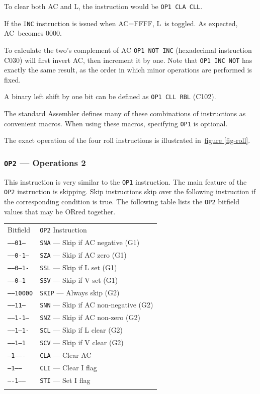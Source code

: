 \documentclass[11pt,a4paper,twocolumns]{article}
\newcommand\zebra{\rowcolors{2}{gray!20}{white}}
\newcommand{\npcf}[2][section]{\hyperref[#2]{#1 \ref*{#2}}}
\newcommand{\npfcf}[1]{\npcf[figure]{#1}}
\newcommand\hex[1]{\textsf{#1}}
\newcommand\register[1]{\textsf{#1}}
\newcommand\A{\register{AC}}
\newcommand\Lreg{\register{L}}
\newcommand\Ireg{\register{I}}
\newcommand\Vreg{\register{V}}
\begin{document}
To clear both \A{} and \Lreg, the instruction would be {\tt OP1 CLA CLL}.

If the {\tt INC} instruction is issued when \A=\hex{FFFF}, \Lreg\ is
toggled. As expected, \A\ becomes \hex{0000}.

To calculate the two's complement of \A{} {\tt OP1 NOT INC} (hexadecimal
instruction \hex{C030}) will first invert \A{}, then increment it by
one. Note that {\tt OP1 INC NOT} has exactly the same result, as the
order in which minor operations are performed is fixed.

A binary left shift by one bit can be defined as {\tt OP1 CLL RBL}
(\hex{C102}).

The standard Assembler defines many of these combinations of 
instructions as
convenient macros. When using these macros, specifying {\tt OP1} is
optional.

The exact operation of the four roll instructions is illustrated
in~\npfcf{fig-roll}.

\subsubsection{{\tt OP2} — Operations 2}
\label{sec-op2}

This instruction is very similar to the {\tt OP1} instruction. The
main feature of the {\tt OP2} instruction is skipping. Skip
instructions skip over the following instruction if the corresponding
condition is true. The following table lists the {\tt OP2} bitfield
values that may be ORred together.

\vspace{1em}\noindent\begin{center}
\zebra
\begin{tabular}{ll}
  Bitfield & {\tt OP2} Instruction \\\noalign{\smallskip}\hline\noalign{\smallskip}
  {\tt -----01---} & {\tt SNA} — Skip if \A{} negative (G1)\\
  {\tt -----0-1--} & {\tt SZA} — Skip if \A{} zero (G1) \\
  {\tt -----0--1-} & {\tt SSL} — Skip if \Lreg{} set (G1) \\
  {\tt -----0---1} & {\tt SSV} — Skip if \Vreg{} set (G1) \\
  {\tt -----10000} & {\tt SKIP} — Always skip (G2) \\
  {\tt -----11---} & {\tt SNN} — Skip if \A{} non-negative (G2) \\
  {\tt -----1-1--} & {\tt SNZ} — Skip if \A{} non-zero (G2) \\
  {\tt -----1--1-} & {\tt SCL} — Skip if \Lreg{} clear (G2) \\
  {\tt -----1---1} & {\tt SCV} — Skip if \Vreg{} clear (G2) \\
  {\tt --1-------} & {\tt CLA} — Clear \A{} \\
  {\tt ---1------} & {\tt CLI} — Clear \Ireg{} flag \\
  {\tt ----1-----} & {\tt STI} — Set \Ireg{} flag \\%
  \noalign{\smallskip}\hline\noalign{\smallskip}
\end{tabular}
\end{center}\vspace{1em}
\end{document}
